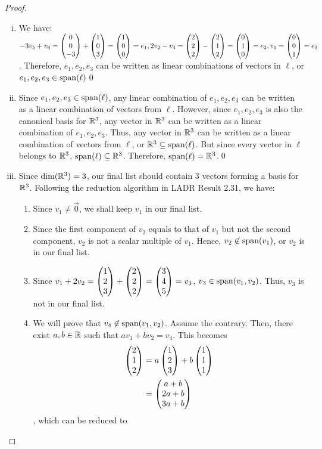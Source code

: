 \begin{proof}
    \renewcommand{\qedsymbol}{$\blacksquare$}
    \begin{enumerate}[(i)]
        \item We have: $-3v_5+v_6=\begin{pmatrix} 0\\ 0\\ -3\end{pmatrix}+\begin{pmatrix} 1\\ 0\\ 3\end{pmatrix}=\begin{pmatrix} 1\\ 0\\ 0\end{pmatrix}=e_1, 2v_2-v_4=\begin{pmatrix} 2\\ 2\\ 2\end{pmatrix}-\begin{pmatrix} 2\\ 1\\ 2\end{pmatrix}=\begin{pmatrix} 0\\ 1\\ 0\end{pmatrix}=e_2,v_5=\begin{pmatrix} 0\\ 0\\ 1\end{pmatrix}=e_3$. Therefore, $e_1,e_2,e_3$ can be written as linear combinations of vectors in $\ell$, or $e_1,e_2,e_3\in\textnormal{span}(\ell)$\qed
        \item Since $e_1,e_2,e_3\in\textnormal{span}(\ell)$, any linear combination of $e_1,e_2,e_3$ can be written as a linear combination of vectors from $\ell$. However, since $e_1,e_2,e_3$ is also the canonical basis for $\mathbb R^3$, any vector in $\mathbb R^3$ can be written as a linear combination of $e_1,e_2,e_3$. Thus, any vector in $\mathbb R^3$ can be written as a linear combination of vectors from $\ell$, or $\mathbb R^3\subseteq\textnormal{span}(\ell)$. But since every vector in $\ell$ belongs to $\mathbb R^3$, $\textnormal{span}(\ell)\subseteq\mathbb R^3$. Therefore, $\textnormal{span}(\ell)=\mathbb R^3$.\qed
        \item Since $\textnormal{dim}(\mathbb R^3)=3$, our final list should contain 3 vectors forming a basis for $\mathbb R^3$. Following the reduction algorithm in LADR Result 2.31, we have:
        \begin{enumerate}[Step 1:]
            \item Since $v_1\not=\vec{0}$, we shall keep $v_1$ in our final list.
            \item Since the first component of $v_2$ equals to that of $v_1$ but not the second component, $v_2$ is not a scalar multiple of $v_1$. Hence, $v_2\not\in\textnormal{span}(v_1)$, or $v_2$ is in our final list.
            \item Since $v_1+2v_2=\begin{pmatrix} 1\\ 2\\ 3\end{pmatrix}+\begin{pmatrix} 2\\ 2\\ 2\end{pmatrix}=\begin{pmatrix} 3\\ 4\\ 5\end{pmatrix}=v_3$, $v_3\in\textnormal{span}(v_1,v_2)$. Thus, $v_3$ is not in our final list.
            \item We will prove that $v_4\not\in\textnormal{span}(v_1,v_2)$. Assume the contrary. Then, there exist $a,b\in\mathbb R$ such that $av_1+bv_2=v_4$. This becomes 
            \[
                \begin{aligned}
                    \begin{pmatrix} 2\\ 1\\ 2\end{pmatrix} &= a \begin{pmatrix} 1\\ 2\\ 3\end{pmatrix}+b \begin{pmatrix} 1\\ 1\\ 1\end{pmatrix}\\
                                          &= \begin{pmatrix} a+b\\ 2a+b\\ 3a+b\end{pmatrix}
                \end{aligned}
            \]
            , which can be reduced to

\end{enumerate}
\end{enumerate}
\end{proof}
